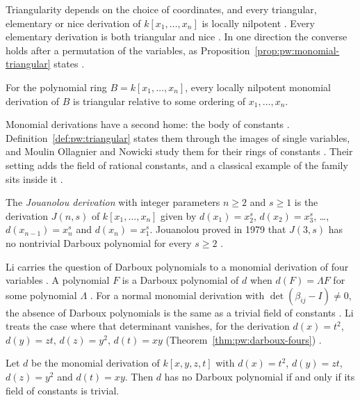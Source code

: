 Triangularity depends on the choice of coordinates, and every triangular,
elementary or nice derivation of $k[x_{1},\dots,x_{n}]$ is locally
nilpotent \cite[p.~76]{Freudenburg2017}. Every elementary derivation is
both triangular and nice \cite[p.~76]{Freudenburg2017}. In one direction
the converse holds after a permutation of the variables, as
Proposition~\ref{prop:pw:monomial-triangular} states
\cite[p.~76]{Freudenburg2017}.

\begin{proposition}\label{prop:pw:monomial-triangular}
For the polynomial ring $B=k[x_{1},\dots,x_{n}]$, every locally nilpotent
monomial derivation of $B$ is triangular relative to some ordering of
$x_{1},\dots,x_{n}$.
\end{proposition}

Monomial derivations have a second home: the body of constants
\cite[p.~3138]{MoulinOllagnierNowicki2011}. Definition~\ref{def:pw:triangular}
states them through the images of single variables, and Moulin Ollagnier and
Nowicki study them for their rings of constants
\cite[p.~3138]{MoulinOllagnierNowicki2011}. Their setting adds the field of
rational constants, and a classical example of the family sits inside it
\cite[p.~3139]{MoulinOllagnierNowicki2011}.

\begin{example}\label{ex:pw:jouanolou}
The \emph{Jouanolou derivation} with integer parameters $n\geq 2$ and
$s\geq 1$ is the derivation $J(n,s)$ of $k[x_{1},\dots,x_{n}]$ given by
$d(x_{1})=x_{2}^{s}$, $d(x_{2})=x_{3}^{s}$, \dots, $d(x_{n-1})=x_{n}^{s}$
and $d(x_{n})=x_{1}^{s}$. Jouanolou proved in 1979 that $J(3,s)$ has no
nontrivial Darboux polynomial for every $s\geq 2$
\cite[p.~3139]{MoulinOllagnierNowicki2011}.
\end{example}

Li carries the question of Darboux polynomials to a monomial derivation of
four variables \cite[p.~1]{Li2015DarbouxMonomial}. A polynomial $F$ is a
Darboux polynomial of $d$ when $d(F)=\Lambda F$ for some polynomial
$\Lambda$ \cite[p.~1]{Li2015DarbouxMonomial}. For a normal monomial
derivation with $\det(\beta_{ij}-I)\neq 0$, the absence of Darboux
polynomials is the same as a trivial field of constants
\cite[p.~2]{Li2015DarbouxMonomial}. Li treats the case where that
determinant vanishes, for the derivation
$d(x)=t^{2}$, $d(y)=zt$, $d(z)=y^{2}$, $d(t)=xy$ (Theorem~\ref{thm:pw:darboux-fours})
\cite[p.~2]{Li2015DarbouxMonomial}.\begin{theorem}\label{thm:pw:darboux-fours}
Let $d$ be the monomial derivation of $k[x,y,z,t]$ with $d(x)=t^{2}$,
$d(y)=zt$, $d(z)=y^{2}$ and $d(t)=xy$. Then $d$ has no Darboux polynomial
if and only if its field of constants is trivial.
\end{theorem}


